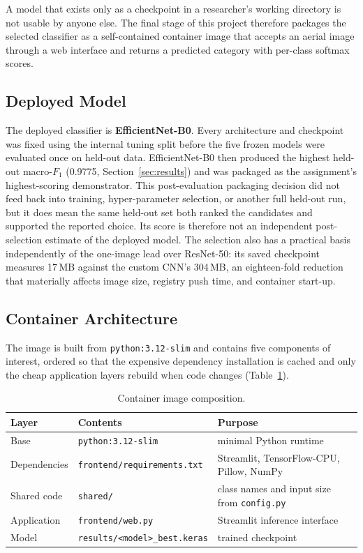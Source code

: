 \documentclass[11pt,twoside,a4paper]{article}
\begin{document}
A model that exists only as a checkpoint in a researcher's working directory is
not usable by anyone else. The final stage of this project therefore packages
the selected classifier as a self-contained container image that accepts
an aerial image through a web interface and returns a predicted category with
per-class softmax scores.

\subsection{Deployed Model}

The deployed classifier is \textbf{EfficientNet-B0}. Every architecture and
checkpoint was fixed using the internal tuning split before the five frozen
models were evaluated once on held-out data. EfficientNet-B0 then produced the
highest held-out macro-$F_1$ (0.9775, Section~\ref{sec:results}) and was packaged
as the assignment's highest-scoring demonstrator. This post-evaluation
packaging decision did not feed back into training, hyper-parameter selection,
or another full held-out run, but it does mean the same held-out set both ranked
the candidates and supported the reported choice. Its score is therefore not an
independent post-selection estimate of the deployed model. The selection also
has a practical basis independently of the one-image lead over ResNet-50: its
saved checkpoint measures 17\,MB against the custom CNN's 304\,MB, an
eighteen-fold reduction that materially affects image size, registry push time,
and container start-up.

\subsection{Container Architecture}

The image is built from \texttt{python:3.12-slim} and contains five components
of interest, ordered so that the expensive dependency installation is cached and
only the cheap application layers rebuild when code changes
(Table~\ref{tab:container}).

\begin{table}[H]
\centering
\caption{Container image composition.}
\label{tab:container}
\small
\begin{tabular}{lll}
\toprule
Layer & Contents & Purpose \\
\midrule
Base & \texttt{python:3.12-slim} & minimal Python runtime \\
Dependencies & \texttt{frontend/requirements.txt} & Streamlit, TensorFlow-CPU, Pillow, NumPy \\
Shared code & \texttt{shared/} & class names and input size from \texttt{config.py} \\
Application & \texttt{frontend/web.py} & Streamlit inference interface \\
Model & \texttt{results/<model>\_best.keras} & trained checkpoint \\
\bottomrule
\end{tabular}
\end{table}
\end{document}

